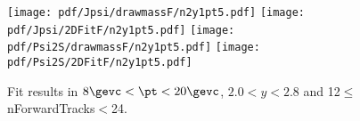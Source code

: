 \begin{figure}[H]
\begin{center}
\texttt{[image: pdf/Jpsi/drawmassF/n2y1pt5.pdf]}
\texttt{[image: pdf/Jpsi/2DFitF/n2y1pt5.pdf]}
\vspace*{-0.5cm}
\texttt{[image: pdf/Psi2S/drawmassF/n2y1pt5.pdf]}
\texttt{[image: pdf/Psi2S/2DFitF/n2y1pt5.pdf]}
\vspace*{-0.5cm}
\end{center}
\caption{Fit results in $8\gevc<\pt<20\gevc$, $2.0<y<2.8$ and 12$\leq$nForwardTracks$<$24.}
\label{Fitn2y1pt5}
\end{figure}

